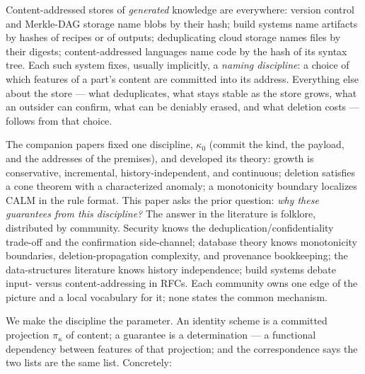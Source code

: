 \documentclass[10pt]{article}
\begin{document}
Content-addressed stores of \emph{generated} knowledge are everywhere: version control and Merkle-DAG storage name blobs by their hash; build systems name artifacts by hashes of recipes or of outputs; deduplicating cloud storage names files by their digests; content-addressed languages name code by the hash of its syntax tree. Each such system fixes, usually implicitly, a \emph{naming discipline}: a choice of which features of a part's content are committed into its address. Everything else about the store --- what deduplicates, what stays stable as the store grows, what an outsider can confirm, what can be deniably erased, and what deletion costs --- follows from that choice.

The companion papers \cite{growth,deletion} fixed one discipline, $\kappa_0$ (commit the kind, the payload, and the addresses of the premises), and developed its theory: growth is conservative, incremental, history-independent, and continuous; deletion satisfies a cone theorem with a characterized anomaly; a monotonicity boundary localizes CALM in the rule format. This paper asks the prior question: \emph{why these guarantees from this discipline?} The answer in the literature is folklore, distributed by community. Security knows the deduplication/confidentiality trade-off and the confirmation side-channel; database theory knows monotonicity boundaries, deletion-propagation complexity, and provenance bookkeeping; the data-structures literature knows history independence; build systems debate input- versus content-addressing in RFCs. Each community owns one edge of the picture and a local vocabulary for it; none states the common mechanism.

We make the discipline the parameter. An identity scheme is a committed projection $\pi_\kappa$ of content; a guarantee is a determination --- a functional dependency between features of that projection; and the correspondence says the two lists are the same list. Concretely:
\end{document}
